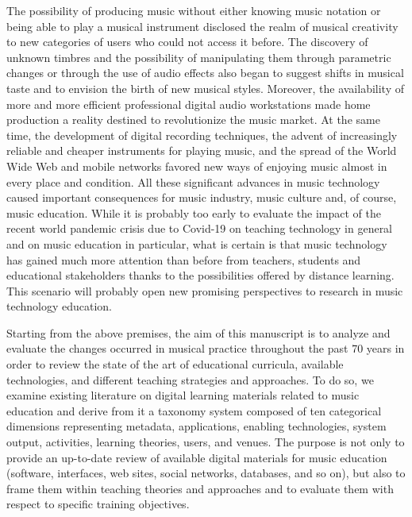 \documentclass[journal]{IEEEtran}
\begin{document}
The possibility of producing music without either knowing music notation or being able to play a musical instrument disclosed the realm of musical creativity to new categories of users who could not access it before. The discovery of unknown timbres and the possibility of manipulating them through parametric changes or through the use of audio effects also began to suggest shifts in musical taste and to envision the birth of new musical styles. Moreover, the availability of more and more efficient professional digital audio workstations made home production a reality destined to revolutionize the music market. At the same time, the development of digital recording techniques, the advent of increasingly reliable and cheaper instruments for playing music, and the spread of the World Wide Web and mobile networks favored new ways of enjoying music almost in every place and condition. All these significant advances in music technology caused important consequences for music industry, music culture and, of course, music education. While it is probably too early to evaluate the impact of the recent world pandemic crisis due to Covid-19 on teaching technology in general and on music education in particular, what is certain is that music technology has gained much more attention than before from teachers, students and educational stakeholders thanks to the possibilities offered by distance learning. This scenario will probably open new promising perspectives to research in music technology education. 

Starting from the above premises, the aim of this manuscript is to analyze and evaluate the changes occurred in musical practice throughout the past 70 years in order to review the state of the art of educational curricula, available technologies, and different teaching strategies and approaches. To do so, we examine existing literature on digital learning materials related to music education and derive from it a taxonomy system composed of ten categorical dimensions representing metadata, applications, enabling technologies, system output, activities, learning theories, users, and venues. The purpose is not only to provide an up-to-date review of available digital materials for music education (software, interfaces, web sites, social networks, databases, and so on), but also to frame them within teaching theories and approaches and to evaluate them with respect to specific training objectives.
\end{document}
